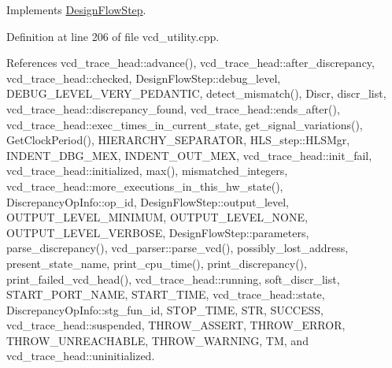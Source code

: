 Implements \hyperlink{classDesignFlowStep_a77d7e38493016766098711ea24f60b89}{Design\+Flow\+Step}.



Definition at line 206 of file vcd\+\_\+utility.\+cpp.



References vcd\+\_\+trace\+\_\+head\+::advance(), vcd\+\_\+trace\+\_\+head\+::after\+\_\+discrepancy, vcd\+\_\+trace\+\_\+head\+::checked, Design\+Flow\+Step\+::debug\+\_\+level, D\+E\+B\+U\+G\+\_\+\+L\+E\+V\+E\+L\+\_\+\+V\+E\+R\+Y\+\_\+\+P\+E\+D\+A\+N\+T\+IC, detect\+\_\+mismatch(), Discr, discr\+\_\+list, vcd\+\_\+trace\+\_\+head\+::discrepancy\+\_\+found, vcd\+\_\+trace\+\_\+head\+::ends\+\_\+after(), vcd\+\_\+trace\+\_\+head\+::exec\+\_\+times\+\_\+in\+\_\+current\+\_\+state, get\+\_\+signal\+\_\+variations(), Get\+Clock\+Period(), H\+I\+E\+R\+A\+R\+C\+H\+Y\+\_\+\+S\+E\+P\+A\+R\+A\+T\+OR, H\+L\+S\+\_\+step\+::\+H\+L\+S\+Mgr, I\+N\+D\+E\+N\+T\+\_\+\+D\+B\+G\+\_\+\+M\+EX, I\+N\+D\+E\+N\+T\+\_\+\+O\+U\+T\+\_\+\+M\+EX, vcd\+\_\+trace\+\_\+head\+::init\+\_\+fail, vcd\+\_\+trace\+\_\+head\+::initialized, max(), mismatched\+\_\+integers, vcd\+\_\+trace\+\_\+head\+::more\+\_\+executions\+\_\+in\+\_\+this\+\_\+hw\+\_\+state(), Discrepancy\+Op\+Info\+::op\+\_\+id, Design\+Flow\+Step\+::output\+\_\+level, O\+U\+T\+P\+U\+T\+\_\+\+L\+E\+V\+E\+L\+\_\+\+M\+I\+N\+I\+M\+UM, O\+U\+T\+P\+U\+T\+\_\+\+L\+E\+V\+E\+L\+\_\+\+N\+O\+NE, O\+U\+T\+P\+U\+T\+\_\+\+L\+E\+V\+E\+L\+\_\+\+V\+E\+R\+B\+O\+SE, Design\+Flow\+Step\+::parameters, parse\+\_\+discrepancy(), vcd\+\_\+parser\+::parse\+\_\+vcd(), possibly\+\_\+lost\+\_\+address, present\+\_\+state\+\_\+name, print\+\_\+cpu\+\_\+time(), print\+\_\+discrepancy(), print\+\_\+failed\+\_\+vcd\+\_\+head(), vcd\+\_\+trace\+\_\+head\+::running, soft\+\_\+discr\+\_\+list, S\+T\+A\+R\+T\+\_\+\+P\+O\+R\+T\+\_\+\+N\+A\+ME, S\+T\+A\+R\+T\+\_\+\+T\+I\+ME, vcd\+\_\+trace\+\_\+head\+::state, Discrepancy\+Op\+Info\+::stg\+\_\+fun\+\_\+id, S\+T\+O\+P\+\_\+\+T\+I\+ME, S\+TR, S\+U\+C\+C\+E\+SS, vcd\+\_\+trace\+\_\+head\+::suspended, T\+H\+R\+O\+W\+\_\+\+A\+S\+S\+E\+RT, T\+H\+R\+O\+W\+\_\+\+E\+R\+R\+OR, T\+H\+R\+O\+W\+\_\+\+U\+N\+R\+E\+A\+C\+H\+A\+B\+LE, T\+H\+R\+O\+W\+\_\+\+W\+A\+R\+N\+I\+NG, TM, and vcd\+\_\+trace\+\_\+head\+::uninitialized.

